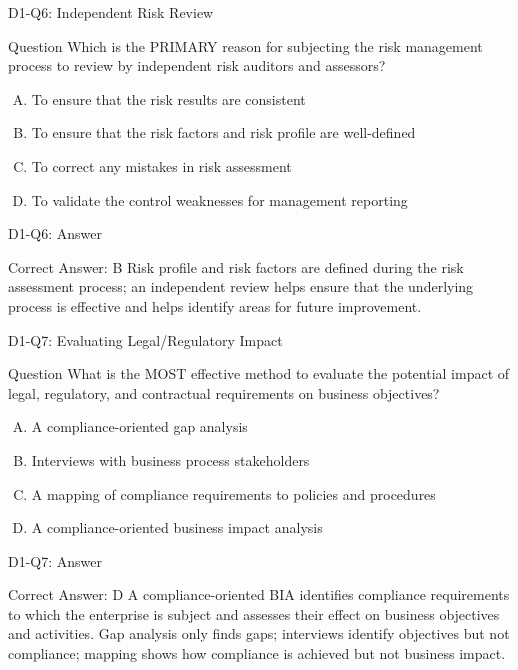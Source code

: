 \documentclass{beamer}
\begin{document}
	\begin{frame}{D1-Q6: Independent Risk Review}
		\begin{block}{Question}
			Which is the PRIMARY reason for subjecting the risk management process to review by independent risk auditors and assessors?
		\end{block}
		\begin{enumerate}[(A)]
			\item To ensure that the risk results are consistent
			\item To ensure that the risk factors and risk profile are well-defined
			\item To correct any mistakes in risk assessment
			\item To validate the control weaknesses for management reporting
		\end{enumerate}
	\end{frame}
	\begin{frame}{D1-Q6: Answer}
		\begin{block}{Correct Answer: B}
			Risk profile and risk factors are defined during the risk assessment process; an independent review helps ensure that the underlying process is effective and helps identify areas for future improvement.
		\end{block}
	\end{frame}
	
	\begin{frame}{D1-Q7: Evaluating Legal/Regulatory Impact}
		\begin{block}{Question}
			What is the MOST effective method to evaluate the potential impact of legal, regulatory, and contractual requirements on business objectives?
		\end{block}
		\begin{enumerate}[(A)]
			\item A compliance-oriented gap analysis
			\item Interviews with business process stakeholders
			\item A mapping of compliance requirements to policies and procedures
			\item A compliance-oriented business impact analysis
		\end{enumerate}
	\end{frame}
	\begin{frame}{D1-Q7: Answer}
		\begin{block}{Correct Answer: D}
			A compliance-oriented BIA identifies compliance requirements to which the enterprise is subject and assesses their effect on business objectives and activities. Gap analysis only finds gaps; interviews identify objectives but not compliance; mapping shows how compliance is achieved but not business impact.
		\end{block}
	\end{frame}
	
\end{document}
